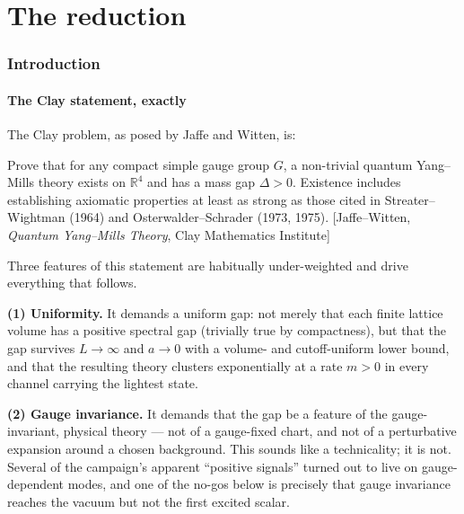 \clearpage
\part{The reduction}
\section{Introduction}

\label{sec:intro}

\subsection{The Clay statement, exactly}

The Clay problem, as posed by Jaffe and Witten, is:

\begin{qbox}
Prove that for any compact simple gauge group $G$, a non-trivial quantum Yang--Mills theory
exists on $\mathbb{R}^4$ and has a mass gap $\Delta>0$. Existence includes establishing
axiomatic properties at least as strong as those cited in Streater--Wightman (1964) and
Osterwalder--Schrader (1973, 1975). [Jaffe--Witten, \emph{Quantum Yang--Mills Theory}, Clay
Mathematics Institute]
\end{qbox}

Three features of this statement are habitually under-weighted and drive everything that follows.

\textbf{(1) Uniformity.} It demands a uniform gap: not merely that each finite lattice volume has
a positive spectral gap (trivially true by compactness), but that the gap survives $L\to\infty$
and $a\to0$ with a volume- and cutoff-uniform lower bound, and that the resulting theory clusters
exponentially at a rate $m>0$ in every channel carrying the lightest state.

\textbf{(2) Gauge invariance.} It demands that the gap be a feature of the gauge-invariant,
physical theory --- not of a gauge-fixed chart, and not of a perturbative expansion around a
chosen background. This sounds like a technicality; it is not. Several of the campaign's
apparent ``positive signals'' turned out to live on gauge-dependent modes, and one of the
no-gos below is precisely that gauge invariance reaches the vacuum but not the first excited
scalar.

